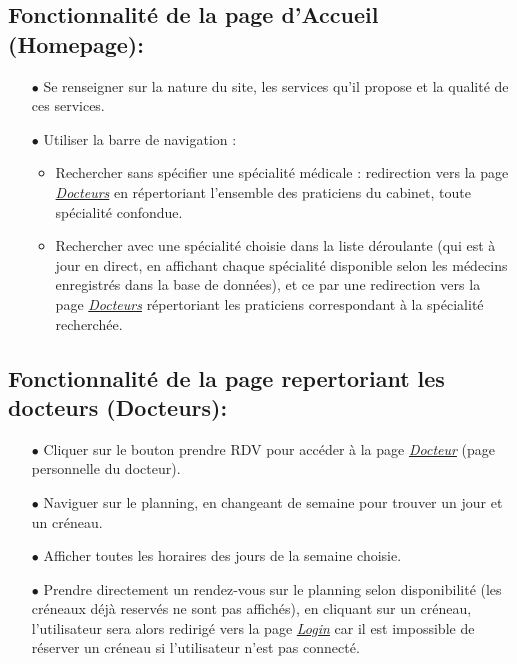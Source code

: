 \documentclass[a4paper]{report}
\begin{document}
\subsection{Fonctionnalité de la page d'Accueil (Homepage):}\label{homepage}
    \begin{itemize}
        \item[$\bullet$] Se renseigner sur la nature du site, les services qu’il propose et la qualité de ces services.
        \item[$\bullet$] Utiliser la barre de navigation :
        \begin{itemize}
            \item Rechercher sans spécifier une spécialité médicale : redirection vers la page \textit{\hyperref[docteurs]{Docteurs}} en  répertoriant l’ensemble des praticiens du cabinet, toute spécialité confondue.
            \item Rechercher avec une spécialité choisie dans la liste déroulante (qui est à jour en direct, en affichant chaque spécialité disponible selon les médecins enregistrés dans la base de données), et ce par une redirection vers la page \textit{\hyperref[docteurs]{Docteurs}} répertoriant les praticiens correspondant à la spécialité recherchée.
        \end{itemize}
    \end{itemize}
    \vspace{3mm}

\subsection{Fonctionnalité de la page repertoriant les docteurs (Docteurs):}\label{docteurs}
    \begin{itemize}
        \item[$\bullet$] Cliquer sur le bouton prendre RDV pour accéder à la page \textit{\hyperref[docteur]{Docteur}} (page personnelle du docteur).
        \item[$\bullet$] Naviguer sur le planning, en changeant de semaine pour trouver un jour et un créneau.
        \item[$\bullet$] Afficher toutes les horaires des jours de la semaine choisie.
        \item[$\bullet$] Prendre directement un rendez-vous sur le planning selon disponibilité (les créneaux déjà reservés ne sont pas affichés), en cliquant sur un créneau, l’utilisateur sera alors redirigé vers la page \textit{\hyperref[login]{Login}} car il est impossible de réserver un créneau si l'utilisateur n'est pas connecté.
    \end{itemize}
    \vspace{3mm}
\end{document}
